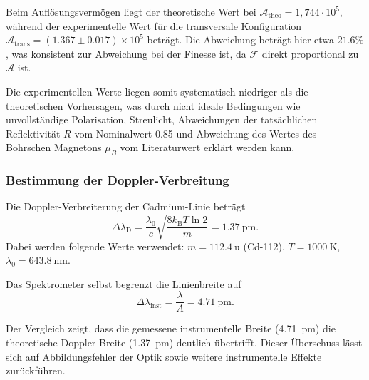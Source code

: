 Beim Auflösungsvermögen liegt der theoretische Wert bei \(\mathcal{A}_{\text{theo}} = 1{,}744 \cdot 10^{5}\), während der experimentelle Wert für die transversale Konfiguration \(\mathcal{A}_{\text{trans}} = (1.367 \pm 0.017) \times 10^5\) beträgt. Die Abweichung beträgt hier etwa $21.6\%$, was konsistent zur Abweichung bei der Finesse ist, da \(\mathcal{F}\) direkt proportional zu \(\mathcal{A}\) ist.

Die experimentellen Werte liegen somit systematisch niedriger als die theoretischen Vorhersagen, was durch nicht ideale Bedingungen wie unvollständige Polarisation, Streulicht, Abweichungen der tatsächlichen Reflektivität \(R\) vom Nominalwert \num{0,85} und Abweichung des Wertes des Bohrschen Magnetons $\mu_B$ vom Literaturwert erklärt werden kann.

\subsubsection{Bestimmung der Doppler-Verbreitung}

Die Doppler-Verbreiterung\cite{Sch09} der Cadmium-Linie beträgt
\begin{equation}
  \Delta\lambda_\text{D}
  = \frac{\lambda_0}{c}
    \sqrt{\frac{8 k_\text{B} T \ln 2}{m}}
  = \SI{1.37}{\pico\meter}.
  \label{eq:doppler}
\end{equation}
Dabei werden folgende Werte verwendet:
$m = \SI{112.4}{\atomicmassunit}$ (Cd-112),
$T = \SI{1000}{\kelvin}$,
$\lambda_0 = \SI{643.8}{\nano\meter}$.

Das Spektrometer selbst begrenzt die Linienbreite auf
\begin{equation}
  \Delta\lambda_\text{inst}
  = \frac{\lambda}{A}
  = \SI{4.71 }{\pico\meter}.
  \label{eq:inst}
\end{equation}

Der Vergleich zeigt, dass die gemessene instrumentelle Breite (\SI{4.71}{\pico\meter}) die theoretische Doppler-Breite (\SI{1.37}{\pico\meter}) deutlich übertrifft.  
Dieser Überschuss lässt sich auf Abbildungsfehler der Optik sowie weitere instrumentelle Effekte zurückführen.



